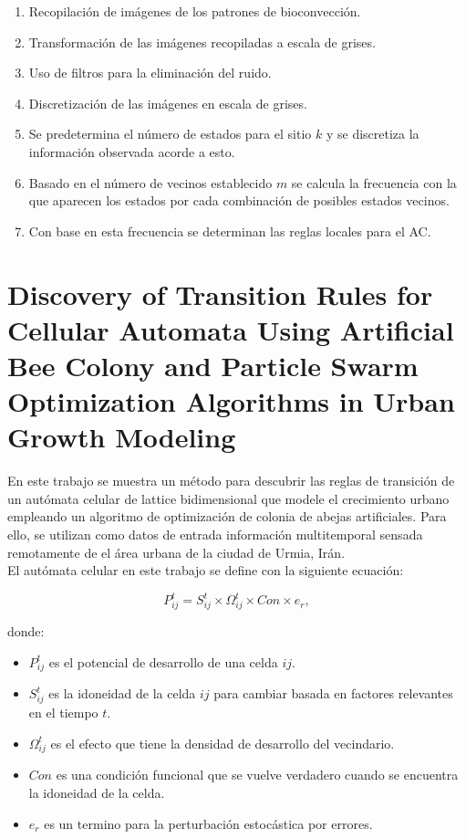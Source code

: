 \begin{enumerate}
	\item Recopilación de imágenes de los patrones de bioconvección.
	\item Transformación de las imágenes recopiladas a escala de grises.
	\item Uso de filtros para la eliminación del ruido.
	\item Discretización de las imágenes en escala de grises.
	\item Se predetermina el número de estados para el sitio $k$ y se discretiza la información observada acorde a esto.
	\item Basado en el número de vecinos establecido $m$ se calcula la frecuencia con la que aparecen los estados por cada combinación de posibles estados vecinos.
	\item Con base en esta frecuencia se determinan las reglas locales para el AC.
\end{enumerate}

\section{Discovery of Transition Rules for Cellular Automata Using Artificial Bee Colony and Particle Swarm Optimization Algorithms in Urban Growth Modeling}

En este trabajo \citep{naghibi2016discovery} se muestra un método para descubrir las reglas de transición de un autómata celular de lattice bidimensional que modele el crecimiento urbano empleando un algoritmo de optimización de colonia de abejas artificiales. Para ello, se utilizan como datos de entrada información multitemporal sensada remotamente de el área urbana de la ciudad de Urmia, Irán.
\\
El autómata celular en este trabajo se define con la siguiente ecuación:

\begin{equation} \label{eq:8}
P^t_{ij} = S^t_{ij}\times\Omega^t_{ij}\times Con\times e_r,
\end{equation}

donde:
\begin{itemize}
	\item $P^t_{ij} $ es el potencial de desarrollo de una celda $ij$.
	\item $S^t_{ij}$ es la idoneidad de la celda $ij$ para cambiar basada en factores relevantes en el tiempo $t$.
	\item $\Omega^t_{ij}$ es el efecto que tiene la densidad de desarrollo del vecindario.
	\item $Con$ es una condición funcional que se vuelve verdadero cuando se encuentra la idoneidad de la celda.
	\item $e_r$ es un termino para la perturbación estocástica por errores.
\end{itemize}

